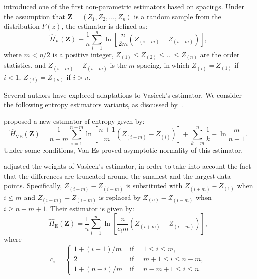 \citet{vasicek1976test} introduced one of the first
non-parametric estimators based on spacings. Under the assumption that
\(\bm{Z}=(Z_1, Z_2,\ldots,Z_n)\) is a random sample from the
distribution \(F(z)\), the estimator is defined as: \begin{equation}
\label{E:Vas}
    \widehat{H}_{\text{V}}(\bm{Z})=\frac{1}{n}\sum_{i=1}^{n}\ln\left[\frac{n}{2m}\left(Z_{(i+m)}-Z_{(i-m)}\right)\right],
    \end{equation} where \(m<n/2\) is a positive integer,
\(Z_{(1)}\leq Z_{(2)}\leq\dots\leq Z_{(n)}\) are the order statistics,
and \(Z_{(i+m)}-Z_{(i-m)}\) is the \(m\)-spacing, in which
\(Z_{(i)}= Z_{(1)}\) if \(i<1\), \(Z_{(i)}= Z_{(n)}\) if \(i>n\).

Several authors have explored adaptations  to Vasicek's estimator. We consider the following entropy estimators variants, as discussed by~\citet{Cassetti2022}.

\citet{Bert1992} proposed a new estimator of entropy given by:
 \begin{equation}
\label{E:VanEs}
	\widehat{H}_{\text{VE}}(\bm{Z})=\frac{1}{n-m}\sum_{i=1}^{n-m}\ln\left[\frac{n+1}{m}\left(Z_{(i+m)}-Z_{(i)}\right)\right]	+\sum_{k=m}^n\frac{1}{k}+\ln\frac{m}{n+1}.
\end{equation}
Under some conditions, Van Es proved asymptotic normality of this estimator.

\citet{Ebrahimi1994} adjusted the weights of Vasicek's estimator, in order to take into account the fact that the differences are truncated around the smallest and the largest data points.
 Specifically, $Z_{(i+m)}-Z_{(i-m)}$ is substituted with  $Z_{(i+m)}-Z_{(1)}$ when $i \leq m$ and $Z_{(i+m)}-Z_{(i-m)}$ is replaced by $Z_{(n)}-Z_{(i-m)}$ when $i \geq n-m+1$. Their estimator is given by:
  \begin{equation}
	\label{E:Ebrahimi}
  \widehat{H}_{\text{E}}(\bm{Z})=\frac{1}{n} \sum_{i=1}^n \ln \left[\frac{n}{c_i m}\left(Z_{(i+m)}-Z_{(i-m)}\right)\right],
  \end{equation} where \[
  c_i=\begin{cases}1+(i-1) / m & \text { if } \quad 1 \leq i \leq m, \\ 2 & \text { if }\quad m+1 \leq i \leq n-m,\\ 1+(n-i) / m & \text { if }\quad n-m+1 \leq i \leq n.\end{cases}
  \]

